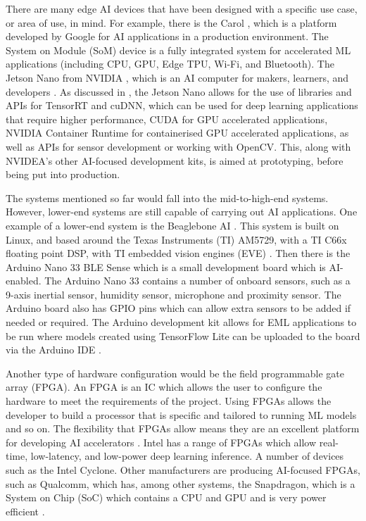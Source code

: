 \documentclass[conference]{IEEEtran}
\begin{document}
There are many edge AI devices that have been designed with a specific use case, or area of use, in mind. For example, there is the Carol \cite{carol}, which is a platform developed by Google for AI applications in a production environment. The System on Module (SoM) device is a fully integrated system for accelerated ML applications (including CPU, GPU, Edge TPU, Wi-Fi, and Bluetooth). The Jetson Nano from NVIDIA \cite{jetson}, which is an AI computer for makers, learners, and developers \cite{jetson1}. As discussed in \cite{jetson1}, the Jetson Nano allows for the use of libraries and APIs for TensorRT and cuDNN, which can be used for deep learning applications that require higher performance, CUDA for GPU accelerated applications, NVIDIA Container Runtime for containerised GPU accelerated applications, as well as APIs for sensor development or working with OpenCV. This, along with NVIDEA's other AI-focused development kits, is aimed at prototyping, before being put into production.

The systems mentioned so far would fall into the mid-to-high-end systems. However, lower-end systems are still capable of carrying out AI applications. One example of a lower-end system is the Beaglebone AI \cite{beagle}. This system is built on Linux, and based around the Texas Instruments (TI) AM5729, with a TI C66x floating point DSP, with TI embedded vision engines (EVE) \cite{tuomo}. Then there is the Arduino Nano 33 BLE Sense which is a small development board which is AI-enabled. The Arduino Nano 33 contains a number of onboard sensors, such as a 9-axis inertial sensor, humidity sensor, microphone and proximity sensor. The Arduino board also has GPIO pins which can allow extra sensors to be added if needed or required. The Arduino development kit allows for EML applications to be run where models created using TensorFlow Lite can be uploaded to the board via the Arduino IDE \cite{arduino}.

Another type of hardware configuration would be the field programmable gate array (FPGA). An FPGA is an IC which allows the user to configure the hardware to meet the requirements of the project. Using FPGAs allows the developer to build a processor that is specific and tailored to running ML models and so on. The flexibility that FPGAs allow means they are an excellent platform for developing AI accelerators \cite{tuomo}. Intel has a range of FPGAs which allow real-time, low-latency, and low-power deep learning inference. A number of devices such as the Intel Cyclone. Other manufacturers are producing AI-focused FPGAs, such as Qualcomm, which has, among other systems, the Snapdragon, which is a System on Chip (SoC) which contains a CPU and GPU and is very power efficient \cite{qualcomm}. 
\end{document}
